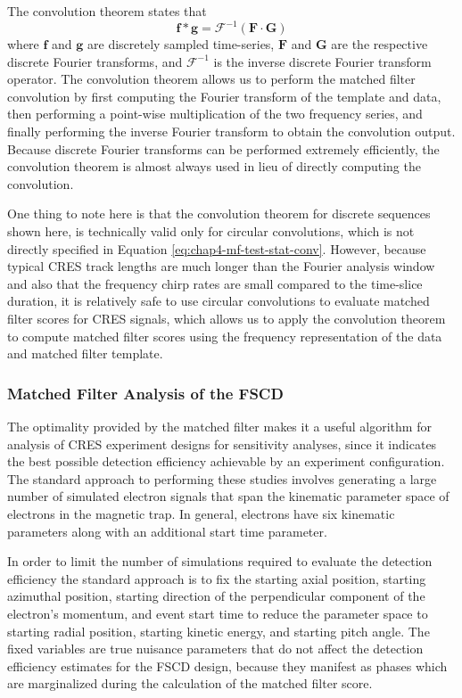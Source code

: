 The convolution theorem states that 
\begin{equation}
    \bm{f}\ast\bm{g} = \mathcal{F}^{-1}\left(\bm{F}\cdot \bm{G}\right)
    \label{eq:chap4-conv-theorem}
\end{equation}
where $\bm{f}$ and $\bm{g}$ are discretely sampled time-series, $\bm{F}$ and $\bm{G}$ are the respective discrete Fourier transforms, and $\mathcal{F}^{-1}$ is the inverse discrete Fourier transform operator. The convolution theorem allows us to perform the matched filter convolution by first computing the Fourier transform of the template and data, then performing a point-wise multiplication of the two frequency series, and finally performing the inverse Fourier transform to obtain the convolution output. Because discrete Fourier transforms can be performed extremely efficiently, the convolution theorem is almost always used in lieu of directly computing the convolution. 

One thing to note here is that the convolution theorem for discrete sequences shown here, is technically valid only for circular convolutions, which is not directly specified in Equation \ref{eq:chap4-mf-test-stat-conv}. However, because typical CRES track lengths are much longer than the Fourier analysis window and also that the frequency chirp rates are small compared to the time-slice duration, it is relatively safe to use circular convolutions to evaluate matched filter scores for CRES signals, which allows us to apply the convolution theorem to compute matched filter scores using the frequency representation of the data and matched filter template.

\subsubsection*{Matched Filter Analysis of the FSCD}

The optimality provided by the matched filter makes it a useful algorithm for analysis of CRES experiment designs for sensitivity analyses, since it indicates the best possible detection efficiency achievable by an experiment configuration. The standard approach to performing these studies involves generating a large number of simulated electron signals that span the kinematic parameter space of electrons in the magnetic trap. In general, electrons have six kinematic parameters along with an additional start time parameter. 

In order to limit the number of simulations required to evaluate the detection efficiency the standard approach is to fix the starting axial position, starting azimuthal position, starting direction of the perpendicular component of the electron's momentum, and event start time to reduce the parameter space to starting radial position, starting kinetic energy, and starting pitch angle. The fixed variables are true nuisance parameters that do not affect the detection efficiency estimates for the FSCD design, because they manifest as phases which are marginalized during the calculation of the matched filter score.

